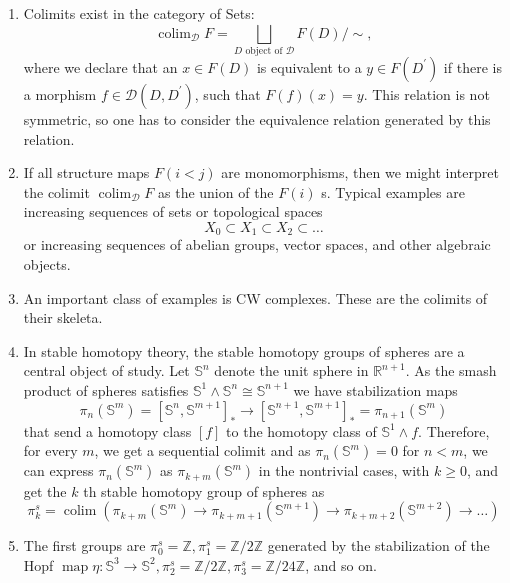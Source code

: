\begin{example}[Colimits]
    \begin{enumerate}
        \item Colimits exist in the category of Sets:
        $$
        \operatorname{colim}_{\mathcal{D}} F=\bigsqcup_{D \text { object of } \mathcal{D}} F(D) / \sim,
        $$
        where we declare that an $x \in F(D)$ is equivalent to a $y \in F\left(D^{\prime}\right)$ if there is a morphism $f \in \mathcal{D}\left(D, D^{\prime}\right)$, such that $F(f)(x)=y$. This relation is not symmetric, so one has to consider the equivalence relation generated by this relation. 
        \item If all structure maps $F(i<j)$ are monomorphisms, then we might interpret the colimit $\operatorname{colim}_{\mathcal{D}} F$ as the union of the $F(i)$ s. Typical examples are increasing sequences of sets or topological spaces
        $$
        X_0 \subset X_1 \subset X_2 \subset \ldots
        $$
        or increasing sequences of abelian groups, vector spaces, and other algebraic objects. 
        \item An important class of examples is CW complexes. These are the colimits of their skeleta.
        \item In stable homotopy theory, the stable homotopy groups of spheres are a central object of study. Let $\mathbb{S}^n$ denote the unit sphere in $\mathbb{R}^{n+1}$. As the smash product of spheres satisfies $\mathbb{S}^1 \wedge \mathbb{S}^n \cong \mathbb{S}^{n+1}$ we have stabilization maps
        $$
        \pi_n\left(\mathbb{S}^m\right)=\left[\mathbb{S}^n, \mathbb{S}^{m+1}\right]_* \rightarrow\left[\mathbb{S}^{n+1}, \mathbb{S}^{m+1}\right]_*=\pi_{n+1}\left(\mathbb{S}^m\right)
        $$
        that send a homotopy class $[f]$ to the homotopy class of $\mathbb{S}^1 \wedge f$. Therefore, for every $m$, we get a sequential colimit and as $\pi_n\left(\mathbb{S}^m\right)=0$ for $n<m$, we can express $\pi_n\left(\mathbb{S}^m\right)$ as $\pi_{k+m}\left(\mathbb{S}^m\right)$ in the nontrivial cases, with $k \geq 0$, and get the $k$ th stable homotopy group of spheres as
        $$
        \pi_k^s=\operatorname{colim}\left(\pi_{k+m}\left(\mathbb{S}^m\right) \rightarrow \pi_{k+m+1}\left(\mathbb{S}^{m+1}\right) \rightarrow \pi_{k+m+2}\left(\mathbb{S}^{m+2}\right) \rightarrow \ldots\right)
        $$
        \item The first groups are $\pi_0^s=\mathbb{Z}, \pi_1^s=\mathbb{Z} / 2 \mathbb{Z}$ generated by the stabilization of the Hopf $\operatorname{map} \eta: \mathbb{S}^3 \rightarrow \mathbb{S}^2, \pi_2^s=\mathbb{Z} / 2 \mathbb{Z}, \pi_3^s=\mathbb{Z} / 24 \mathbb{Z}$, and so on.

\end{enumerate}
\end{example}
